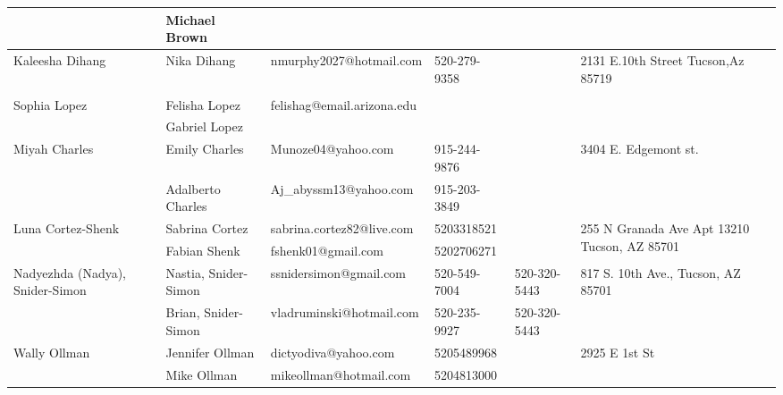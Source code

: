 \documentclass[landscape]{article}\usepackage[]{graphicx}\usepackage[]{color}
\begin{document}
\begin{longtable}{p{70pt}|p{75pt}|p{120pt}|p{60pt}|p{60pt}|p{120pt}|}
 & Michael Brown &  &  &  & \\
\hline
\multirow{2}{70pt}{Kaleesha Dihang} & Nika Dihang & nmurphy2027@hotmail.com & 520-279-9358 &  & \multirow{2}{100pt}{2131 E.10th Street Tucson,Az 85719} \\
 &  &  &  &  & \\
\hline
\multirow{2}{70pt}{Sophia Lopez} & Felisha Lopez & felishag@email.arizona.edu &  &  & \multirow{2}{100pt}{} \\
 & Gabriel Lopez &  &  &  & \\
\hline
\multirow{2}{70pt}{Miyah Charles} & Emily Charles & Munoze04@yahoo.com & 915-244-9876 &  & \multirow{2}{100pt}{3404 E. Edgemont st.} \\
 & Adalberto Charles & Aj\_abyssm13@yahoo.com & 915-203-3849 &  & \\
\hline
\multirow{2}{70pt}{Luna Cortez-Shenk} & Sabrina Cortez & sabrina.cortez82@live.com & 5203318521 &  & \multirow{2}{100pt}{255 N Granada Ave Apt 13210 Tucson, AZ 85701} \\
 & Fabian Shenk & fshenk01@gmail.com & 5202706271 &  & \\
\hline
\multirow{2}{70pt}{Nadyezhda (Nadya), Snider-Simon} & Nastia, Snider-Simon & ssnidersimon@gmail.com & 520-549-7004 & 520-320-5443 & \multirow{2}{100pt}{817 S. 10th Ave., Tucson, AZ 85701} \\
 & Brian, Snider-Simon & vladruminski@hotmail.com & 520-235-9927 & 520-320-5443 & \\
\hline
\multirow{2}{70pt}{Wally Ollman} & Jennifer Ollman & dictyodiva@yahoo.com & 5205489968 &  & \multirow{2}{100pt}{2925 E 1st St} \\
 & Mike Ollman & mikeollman@hotmail.com & 5204813000 &  & \\
\hline
\end{longtable}
\newpage
\end{document}
